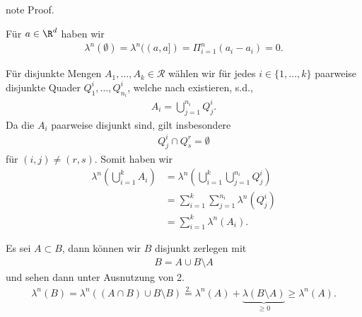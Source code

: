 \documentclass[letterpaper,10pt,german]{jupyterBook}
\begin{document}
\begin{sphinxadmonition}{note}
\sphinxAtStartPar
Proof. 

\sphinxAtStartPar
Für \(a\in\R^d\) haben wir
\begin{equation*}
\begin{split}\lambda^n(\emptyset) = \lambda^n((a,a]) = \Pi_{i=1}^n (a_i - a_i) = 0.\end{split}
\end{equation*}
\sphinxAtStartPar
{}

\sphinxAtStartPar
Für disjunkte Mengen \(A_1,\ldots, A_k\in\mathcal{R}\) wählen wir für jedes \(i\in\{1,\ldots,k\}\) paarweise disjunkte Quader
\(Q^i_1,\ldots, Q^i_{n_i}\), welche nach {\hyperref[\detokenize{masstheorie/masstheorie:lem:disRect}]{}} existieren, s.d.,
\begin{equation*}
\begin{split}A_i = \bigcup_{j=1}^{n_i} Q^i_j.\end{split}
\end{equation*}
\sphinxAtStartPar
Da die \(A_i\) paarweise disjunkt sind, gilt insbesondere
\begin{equation*}
\begin{split}Q^i_j \cap Q^r_s = \emptyset\end{split}
\end{equation*}
\sphinxAtStartPar
für \((i,j)\neq (r,s)\). Somit haben wir
\begin{equation*}
\begin{split}\lambda^n\left(\bigcup_{i=1}^k A_i \right) &= \lambda^n\left(\bigcup_{i=1}^k \bigcup_{j=1}^{n_i} Q^i_j \right) 
\\&=
\sum_{i=1}^k \sum_{j=1}^{n_i} \lambda^n(Q^i_j)
\\&= 
\sum_{i=1}^k \lambda^n(A_i).\end{split}
\end{equation*}
\sphinxAtStartPar
{}

\sphinxAtStartPar
Es sei \(A\subset B\), dann können wir \(B\) disjunkt zerlegen mit
\begin{equation*}
\begin{split}B = A \cup B\setminus A\end{split}
\end{equation*}
\sphinxAtStartPar
und sehen dann unter Ausnutzung von 2.
\begin{equation*}
\begin{split}\lambda^n(B) = \lambda^n((A\cap B)\cup B\setminus B) \overset{2.}{=} 
\lambda^n(A) + \underbrace{\lambda(B\setminus A)}_{\geq 0} \geq \lambda^n(A).\end{split}
\end{equation*}
\sphinxAtStartPar
{}


\end{sphinxadmonition}
\end{document}
